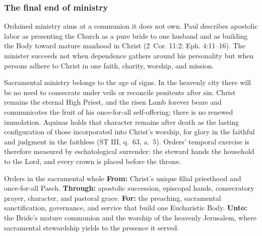 \subsubsection{The final end of ministry}

Ordained ministry aims at a communion it does not own. Paul describes apostolic labor as presenting the Church as a pure bride to one husband and as building the Body toward mature manhood in Christ (2~Cor. 11:2; Eph. 4:11--16). The minister succeeds not when dependence gathers around his personality but when persons adhere to Christ in one faith, charity, worship, and mission.

Sacramental ministry belongs to the age of signs. In the heavenly city there will be no need to consecrate under veils or reconcile penitents after sin. Christ remains the eternal High Priest, and the risen Lamb forever bears and communicates the fruit of his once-for-all self-offering; there is no renewed immolation. Aquinas holds that character remains after death as the lasting configuration of those incorporated into Christ's worship, for glory in the faithful and judgment in the faithless (ST III, q.~63, a.~5). Orders' temporal exercise is therefore measured by eschatological surrender: the steward hands the household to the Lord, and every crown is placed before the throne.

\begin{massbox}{Orders in the sacramental whole}
\textbf{From:} Christ's unique filial priesthood and once-for-all Pasch. \textbf{Through:} apostolic succession, episcopal hands, consecratory prayer, character, and pastoral grace. \textbf{For:} the preaching, sacramental sanctification, governance, and service that build one Eucharistic Body. \textbf{Unto:} the Bride's mature communion and the worship of the heavenly Jerusalem, where sacramental stewardship yields to the presence it served.
\end{massbox}
